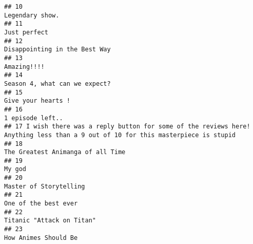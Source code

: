 \documentclass[
]{article}
\begin{document}
\begin{verbatim}
## 10                                                                                                               Legendary show.
## 11                                                                                                                  Just perfect
## 12                                                                                                 Disappointing in the Best Way
## 13                                                                                                                   Amazing!!!!
## 14                                                                                                 Season 4, what can we expect?
## 15                                                                                                            Give your hearts !
## 16                                                                                                              1 episode left..
## 17 I wish there was a reply button for some of the reviews here! Anything less than a 9 out of 10 for this masterpiece is stupid
## 18                                                                                             The Greatest Animanga of all Time
## 19                                                                                                                        My god
## 20                                                                                                        Master of Storytelling
## 21                                                                                                          One of the best ever
## 22                                                                                                     Titanic "Attack on Titan"
## 23                                                                                                          How Animes Should Be

\end{verbatim}
\end{document}
